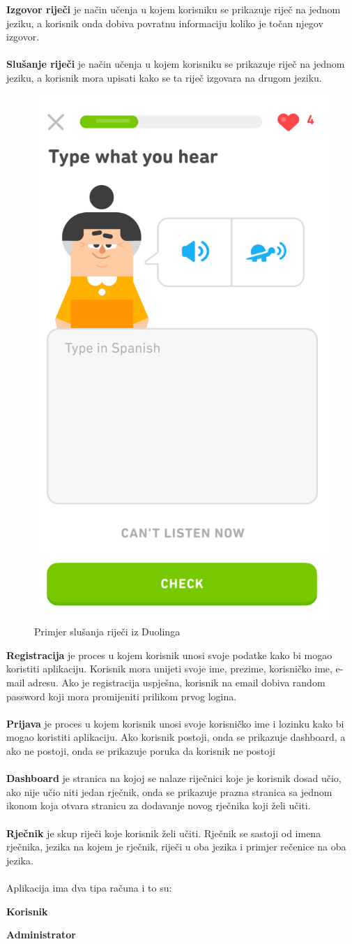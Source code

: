 		\textbf{Izgovor riječi} je način učenja u kojem korisniku se prikazuje riječ na jednom jeziku, a korisnik onda dobiva povratnu informaciju koliko je točan njegov izgovor.
		\\
		\\
		\textbf{Slušanje riječi} je način učenja u kojem korisniku se prikazuje riječ na jednom jeziku, a korisnik mora upisati kako se ta riječ izgovara na drugom jeziku.
		\begin{figure}[H]
			\centering
			\includegraphics[width=0.4\linewidth]{slike/Duolingo.png}
			\caption{Primjer slušanja riječi iz Duolinga}
			\label{fig:rijecnik}
		\end{figure}

		\textbf{Registracija} je proces u kojem korisnik unosi svoje podatke kako bi mogao koristiti aplikaciju.
		Korisnik mora unijeti svoje ime, prezime, korisničko ime, e-mail adresu.
		Ako je registracija uspješna, korisnik na email dobiva random password koji mora promijeniti prilikom prvog logina.
		\\
		\\
		\textbf{Prijava} je proces u kojem korisnik unosi svoje korisničko ime i lozinku kako bi mogao koristiti aplikaciju.
		Ako korisnik postoji, onda se prikazuje dashboard, a ako ne postoji, onda se prikazuje poruka da korisnik ne postoji
		\\
		\\
		\textbf{Dashboard} je stranica na kojoj se nalaze riječnici koje je korisnik dosad učio, ako nije učio niti jedan rječnik, onda se prikazuje prazna stranica sa jednom ikonom koja otvara stranicu za dodavanje novog rječnika koji želi učiti.
		\\
		\\
		\textbf{Rječnik} je skup riječi koje korisnik želi učiti.
		Rječnik se sastoji od imena rječnika, jezika na kojem je rječnik, riječi u oba jezika i primjer rečenice na oba jezika.
		\\
		\\
		Aplikacija ima dva tipa računa i to su:
		\begin{packed_item}
			\item \textbf{Korisnik} 
			\item \textbf{Administrator}
		\end{packed_item}

